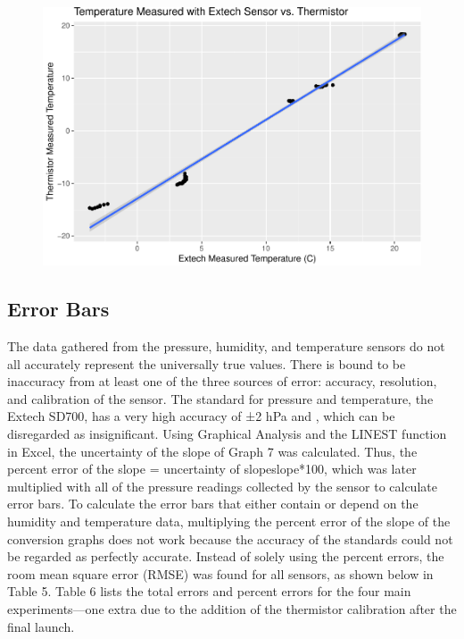 \documentclass[12pt,]{article}
\begin{document}
\begin{figure}[h]

{\centering \includegraphics{paper_files/figure-latex/temp2-1} 

}

\caption{\label{fig:figs}}\label{fig:temp2}
\end{figure}

\subsection{Error Bars}\label{error-bars}

The data gathered from the pressure, humidity, and temperature sensors
do not all accurately represent the universally true values. There is
bound to be inaccuracy from at least one of the three sources of error:
accuracy, resolution, and calibration of the sensor. The standard for
pressure and temperature, the Extech SD700, has a very high accuracy of
±2 hPa and , which can be disregarded as insignificant. Using Graphical
Analysis and the LINEST function in Excel, the uncertainty of the slope
of Graph 7 was calculated. Thus, the percent error of the slope =
uncertainty of slopeslope*100, which was later multiplied with all of
the pressure readings collected by the sensor to calculate error bars.
To calculate the error bars that either contain or depend on the
humidity and temperature data, multiplying the percent error of the
slope of the conversion graphs does not work because the accuracy of the
standards could not be regarded as perfectly accurate. Instead of solely
using the percent errors, the room mean square error (RMSE) was found
for all sensors, as shown below in Table 5. Table 6 lists the total
errors and percent errors for the four main experiments---one extra due
to the addition of the thermistor calibration after the final launch.
\end{document}
